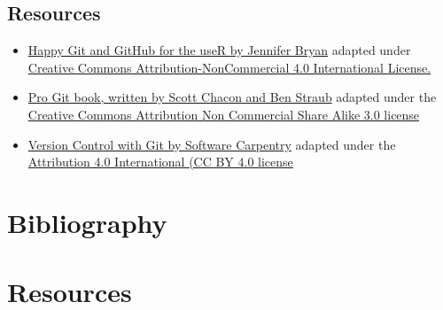 \documentclass[
]{book}
\providecommand{\tightlist}{%
  \setlength{\itemsep}{0pt}\setlength{\parskip}{0pt}}
\begin{document}
\hypertarget{resources}{%
\section{Resources}\label{resources}}

\begin{itemize}
\tightlist
\item
  \href{http://happygitwithr.com/rmd-test-drive.html}{Happy Git and GitHub for the useR by Jennifer Bryan} adapted under \href{https://creativecommons.org/licenses/by/4.0/}{Creative Commons Attribution-NonCommercial 4.0 International License.}
\item
  \href{https://git-scm.com/book/en/v2}{Pro Git book, written by Scott Chacon and Ben Straub} adapted under the \href{https://creativecommons.org/licenses/by/3.0/}{Creative Commons Attribution Non Commercial Share Alike 3.0 license}
\item
  \href{http://swcarpentry.github.io/git-novice/}{Version Control with Git by Software Carpentry} adapted under the \href{https://creativecommons.org/licenses/by/4.0/}{Attribution 4.0 International (CC BY 4.0 license}
\end{itemize}

\hypertarget{bibliography}{%
\chapter{Bibliography}\label{bibliography}}

\hypertarget{resources-1}{%
\chapter{Resources}\label{resources-1}}
\end{document}
